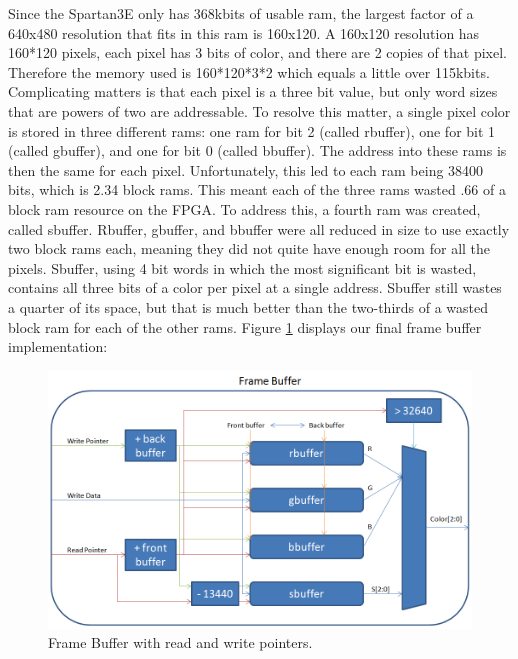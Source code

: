 \documentclass[onecolumn]{IEEEtran}
\begin{document}
Since the Spartan3E only has 368kbits of usable ram, the largest factor of a 640x480 resolution that fits in this ram is 160x120.  A 160x120 resolution has 160*120 pixels, each pixel has 3 bits of color, and there are 2 copies of that pixel.  Therefore the memory used is 160*120*3*2 which equals a little over 115kbits.  Complicating matters is that each pixel is a three bit value, but only word sizes that are powers of two are addressable.  To resolve this matter, a single pixel color is stored in three different rams: one ram for bit 2 (called rbuffer), one for bit 1 (called gbuffer), and one for bit 0 (called bbuffer).  The address into these rams is then the same for each pixel.  Unfortunately, this led to each ram being 38400 bits, which is 2.34 block rams.  This meant each of the three rams wasted .66 of a block ram resource on the FPGA.  To address this, a fourth ram was created, called sbuffer.  Rbuffer, gbuffer, and bbuffer were all reduced in size to use exactly two block rams each, meaning they did not quite have enough room for all the pixels.  Sbuffer, using 4 bit words in which the most significant bit is wasted, contains all three bits of a color per pixel at a single address.  Sbuffer still wastes a quarter of its space, but that is much better than the two-thirds of a wasted block ram for each of the other rams.  Figure \ref{fig:frameBuffer} displays our final frame buffer implementation:

\begin{figure}[H]
	\centering
	\includegraphics[width=1.0\textwidth]{framebuffer.png}
	\caption{Frame Buffer with read and write pointers.}
	\label{fig:frameBuffer}
\end{figure}
\end{document}
